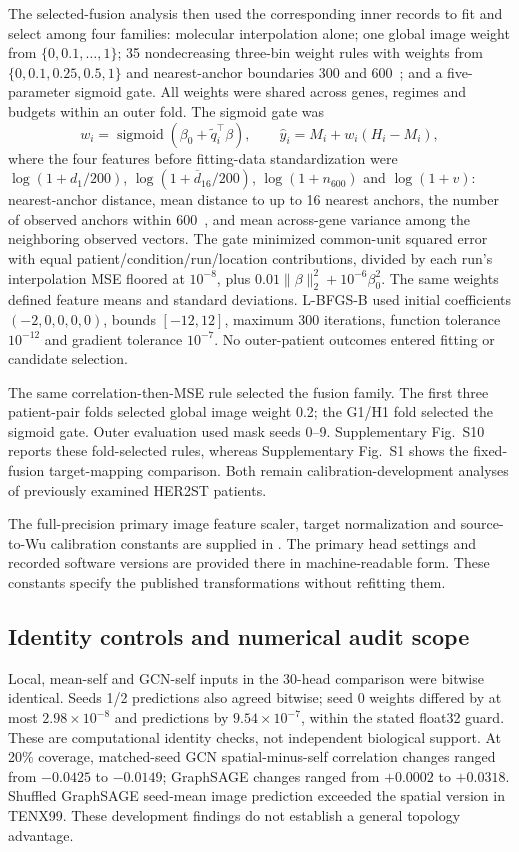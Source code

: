 The selected-fusion analysis then used the corresponding inner records to fit and select among four families: molecular interpolation alone; one global image weight from $\{0, 0.1,\ldots,1\}$; 35 nondecreasing three-bin weight rules with weights from $\{0, 0.1, 0.25, 0.5,1\}$ and nearest-anchor boundaries 300 and 600~\um{}; and a five-parameter sigmoid gate. All weights were shared across genes, regimes and budgets within an outer fold. The sigmoid gate was
\[
 w_i=\operatorname{sigmoid}(\beta_0+\widetilde q_i^\top\beta),\qquad
 \widehat y_i=M_i+w_i(H_i-M_i),
\]
where the four features before fitting-data standardization were $\log(1+d_1/200)$, $\log(1+\overline d_{16}/200)$, $\log(1+n_{600})$ and $\log(1+v)$: nearest-anchor distance, mean distance to up to 16 nearest anchors, the number of observed anchors within 600~\um{}, and mean across-gene variance among the neighboring observed vectors. The gate minimized common-unit squared error with equal patient/condition/run/location contributions, divided by each run's interpolation MSE floored at $10^{-8}$, plus $0.01\|\beta\|_2^2+10^{-6}\beta_0^2$. The same weights defined feature means and standard deviations. L-BFGS-B used initial coefficients $(-2,0,0,0,0)$, bounds $[-12,12]$, maximum 300 iterations, function tolerance $10^{-12}$ and gradient tolerance $10^{-7}$. No outer-patient outcomes entered fitting or candidate selection.

The same correlation-then-MSE rule selected the fusion family. The first three patient-pair folds selected global image weight 0.2; the G1/H1 fold selected the sigmoid gate. Outer evaluation used mask seeds 0--9. Supplementary Fig.~S10 reports these fold-selected rules, whereas Supplementary Fig.~S1 shows the fixed-fusion target-mapping comparison. Both remain calibration-development analyses of previously examined HER2ST patients.


The full-precision primary image feature scaler, target normalization and source-to-Wu calibration constants are supplied in . The primary head settings and recorded software versions are provided there in machine-readable form. These constants specify the published transformations without refitting them.

\subsection{Identity controls and numerical audit scope}
Local, mean-self and GCN-self inputs in the 30-head comparison were bitwise identical. Seeds 1/2 predictions also agreed bitwise; seed 0 weights differed by at most $2.98\times10^{-8}$ and predictions by $9.54\times10^{-7}$, within the stated float32 guard. These are computational identity checks, not independent biological support. At 20\% coverage, matched-seed GCN spatial-minus-self correlation changes ranged from $-0.0425$ to $-0.0149$; GraphSAGE changes ranged from $+0.0002$ to $+0.0318$. Shuffled GraphSAGE seed-mean image prediction exceeded the spatial version in TENX99. These development findings do not establish a general topology advantage.

